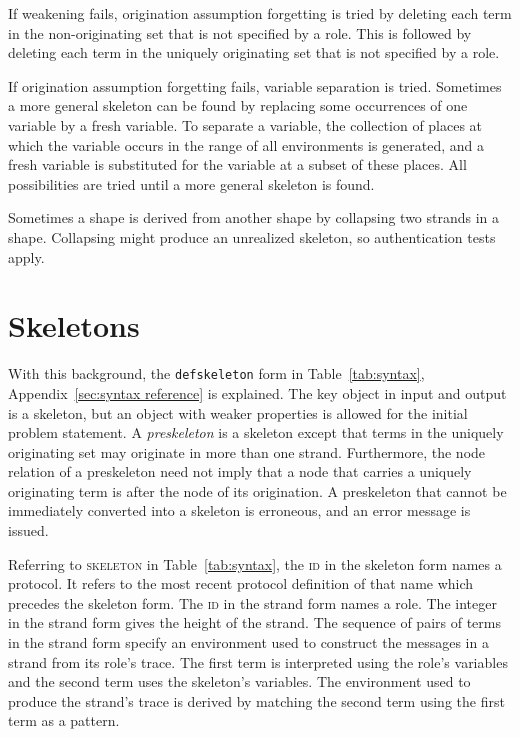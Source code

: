 \documentclass[12pt]{article}
\begin{document}
If weakening fails, origination assumption forgetting is tried by
deleting each term in the non-originating set that is not
specified by a role.  This is followed by deleting each term in the
uniquely originating set that is not specified by a role.

If origination assumption forgetting fails, variable separation is
tried.  Sometimes a more general skeleton can be found by replacing
some occurrences of one variable by a fresh variable.  To separate a
variable, the collection of places at which the variable occurs in the
range of all environments is generated, and a fresh variable is
substituted for the variable at a subset of these places.  All
possibilities are tried until a more general skeleton is found.

Sometimes a shape is derived from another shape by collapsing two
strands in a shape.  Collapsing might produce an unrealized skeleton,
so authentication tests apply.

\section{Skeletons}\label{sec:skeletons}

With this background, the \texttt{defskeleton} form in
Table~\ref{tab:syntax}, Appendix~\ref{sec:syntax reference} is
explained.  The key object in {\cpsa} input and output is a skeleton,
but an object with weaker properties is allowed for the initial
problem statement.  A \emph{preskeleton} is a
skeleton except that terms in the uniquely originating set may
originate in more than one strand.  Furthermore, the node relation of
a preskeleton need not imply that a node that carries a uniquely
originating term is after the node of its origination.  A preskeleton
that cannot be immediately converted into a skeleton is erroneous, and
an error message is issued.

Referring to \textsc{skeleton} in Table~\ref{tab:syntax}, the
\textsc{id} in the skeleton form names a protocol.  It refers to
the most recent protocol definition of that name which precedes the
skeleton form.  The \textsc{id} in the strand form names a role.
The integer in the strand form gives the height of the strand.  The
sequence of pairs of terms in the strand form specify an environment
used to construct the messages in a strand from its role's trace.  The
first term is interpreted using the role's variables and the second
term uses the skeleton's variables.  The environment used to
produce the strand's trace is derived by matching the second term
using the first term as a pattern.
\end{document}
